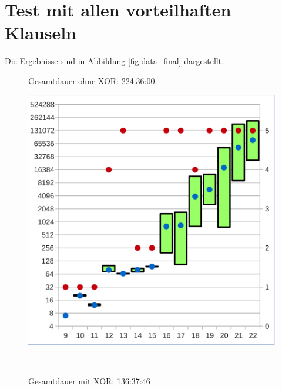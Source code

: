\section{Test mit allen vorteilhaften Klauseln} %
\label{sec:test_beste}

Die Ergebnisse sind in Abbildung \ref{fig:data_final} dargestellt.


\begin{figure}[!h]
  \centering
  \begin{minipage}[c]{0.45\textwidth}
  \begin{flushleft}Gesamtdauer ohne XOR: 224:36:00\end{flushleft}
  \includegraphics[scale=0.55]{images/data_final_knf}
  \end{minipage}
  \begin{minipage}[c]{0.09\textwidth}
  ~~
  \end{minipage}
  \begin{minipage}[c]{0.45\textwidth}
  \begin{flushleft}Gesamtdauer mit XOR: 136:37:46\end{flushleft}

\end{minipage}
\end{figure}
